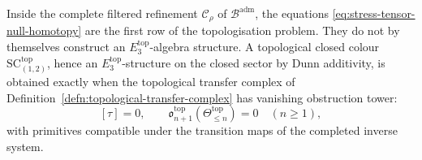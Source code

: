 \begin{thm}
\label{thm:topologisation-by-stress-tensor}
Inside the complete filtered refinement $\mathcal C_\rho$ of
$\mathcal B^{\mathrm{adm}}$, the equations
\eqref{eq:stress-tensor-null-homotopy} are the first row of the
topologisation problem.  They do not by themselves construct an
\(E_3^{\mathrm{top}}\)-algebra structure.  A topological closed colour
\(\mathrm{SC}^{\mathrm{top}}_{(1,2)}\), hence an
\(E_3^{\mathrm{top}}\)-structure on the closed sector by Dunn
additivity, is obtained exactly when the topological transfer complex of
Definition~\ref{defn:topological-transfer-complex} has vanishing
obstruction tower:
\[
  [\tau]=0,\qquad
  \mathfrak o^{\mathrm{top}}_{n+1}(\Theta^{\mathrm{top}}_{\le n})=0
  \quad(n\ge 1),
\]
with primitives compatible under the transition maps of the completed
inverse system.


\end{thm}

